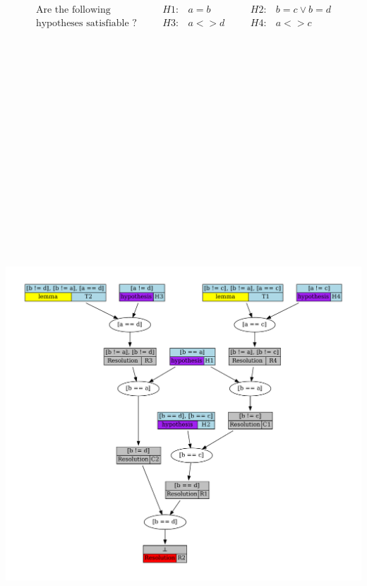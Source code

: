 \documentclass[portrait,a0,final]{a0poster}
\begin{document}
\begin{center}
\begin{multicols}{2}
{
  \vspace{.5cm}
  \[
  \begin{matrix}
    \text{Are the following} & \quad & H1: & a = b   & \quad & H2: & b = c \lor b = d \\
    \text{hypotheses satisfiable ?} & \quad & H3: & a <> d  & \quad & H4: & a <> c \\
  \end{matrix}
  \]
  \includegraphics[height=33cm]{proof}
}


\end{multicols}
\end{center}
\end{document}
